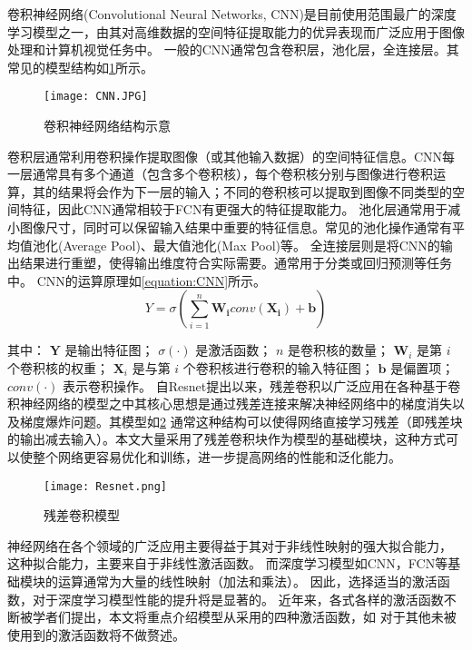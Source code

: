 卷积神经网络(Convolutional Neural Networks, CNN)是目前使用范围最广的深度学习模型之一，由其对高维数据的空间特征提取能力的优异表现而广泛应用于图像处理和计算机视觉任务中。
一般的CNN通常包含卷积层，池化层，全连接层。其常见的模型结构如\cref{figure:CNN}所示。

\begin{figure}[h]
  \centering
\texttt{[image: CNN.JPG]}
\caption{卷积神经网络结构示意}
\label{figure:CNN}
\end{figure}

卷积层通常利用卷积操作提取图像（或其他输入数据）的空间特征信息。CNN每一层通常具有多个通道（包含多个卷积核），每个卷积核分别与图像进行卷积运算，其的结果将会作为下一层的输入；不同的卷积核可以提取到图像不同类型的空间特征，因此CNN通常相较于FCN有更强大的特征提取能力。
池化层通常用于减小图像尺寸，同时可以保留输入结果中重要的特征信息。常见的池化操作通常有平均值池化(Average Pool)、最大值池化(Max Pool)等。
全连接层则是将CNN的输出结果进行重塑，使得输出维度符合实际需要。通常用于分类或回归预测等任务中。
CNN的运算原理如\cref{equation:CNN}所示。
\begin{equation}
  \label{equation:CNN}
  Y = \sigma\left(\sum_{i=1}^{n} \boldsymbol{W_i} conv(\boldsymbol{X_i}) + \boldsymbol{b}\right)
\end{equation}

其中：
$\mathbf{Y}$ 是输出特征图；
$\sigma(\cdot)$ 是激活函数；
$n$ 是卷积核的数量；
$\mathbf{W}_i$ 是第 $i$ 个卷积核的权重；
$\mathbf{X}_i$ 是与第 $i$ 个卷积核进行卷积的输入特征图；
$\mathbf{b}$ 是偏置项；
$conv(\cdot)$ 表示卷积操作。
自Resnet提出以来\cite{2016Resnet}，残差卷积以广泛应用在各种基于卷积神经网络的模型之中其核心思想是通过残差连接来解决神经网络中的梯度消失以及梯度爆炸问题。其模型如\cref{figure:Resnet}
通常这种结构可以使得网络直接学习残差（即残差块的输出减去输入）。本文大量采用了残差卷积块作为模型的基础模块，这种方式可以使整个网络更容易优化和训练，进一步提高网络的性能和泛化能力。
\begin{figure}[h]
  \centering
  \texttt{[image: Resnet.png]}
  \caption{残差卷积模型}
  \label{figure:Resnet}
\end{figure}




神经网络在各个领域的广泛应用主要得益于其对于非线性映射的强大拟合能力，
这种拟合能力，主要来自于非线性激活函数。
而深度学习模型如CNN，FCN等基础模块的运算通常为大量的线性映射（加法和乘法）。
因此，选择适当的激活函数，对于深度学习模型性能的提升将是显著的。
近年来，各式各样的激活函数不断被学者们提出，本文将重点介绍模型从采用的四种激活函数，如
对于其他未被使用到的激活函数将不做赘述。


